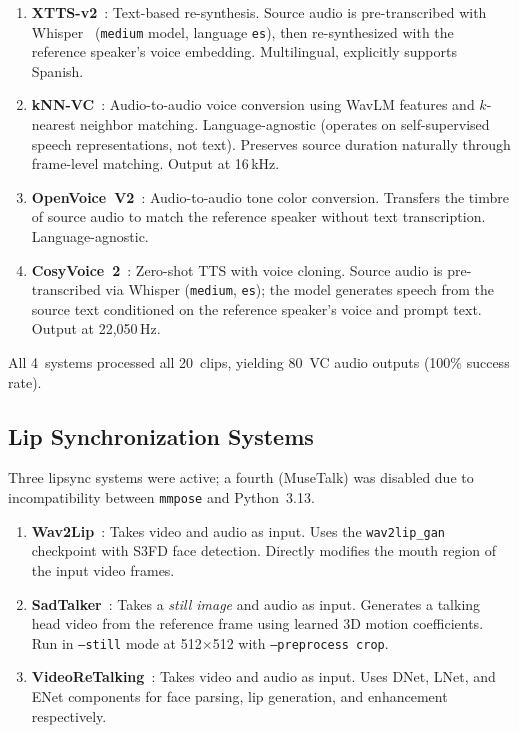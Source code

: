\documentclass[11pt,a4paper]{article}
\begin{document}
\begin{enumerate}
\item \textbf{XTTS-v2}~\citep{casanova2024xtts}: Text-based re-synthesis. Source audio is pre-transcribed with Whisper~\citep{radford2023whisper} (\texttt{medium} model, language \texttt{es}), then re-synthesized with the reference speaker's voice embedding. Multilingual, explicitly supports Spanish.

\item \textbf{kNN-VC}~\citep{baas2023knnvc}: Audio-to-audio voice conversion using WavLM features and $k$-nearest neighbor matching. Language-agnostic (operates on self-supervised speech representations, not text). Preserves source duration naturally through frame-level matching. Output at 16\,kHz.

\item \textbf{OpenVoice~V2}~\citep{qin2023openvoice}: Audio-to-audio tone color conversion. Transfers the timbre of source audio to match the reference speaker without text transcription. Language-agnostic.

\item \textbf{CosyVoice~2}~\citep{du2024cosyvoice}: Zero-shot TTS with voice cloning. Source audio is pre-transcribed via Whisper (\texttt{medium}, \texttt{es}); the model generates speech from the source text conditioned on the reference speaker's voice and prompt text. Output at 22,050\,Hz.
\end{enumerate}

All 4~systems processed all 20~clips, yielding 80~VC audio outputs (100\% success rate).

\subsection{Lip Synchronization Systems}

Three lipsync systems were active; a fourth (MuseTalk) was disabled due to incompatibility between \texttt{mmpose} and Python~3.13.

\begin{enumerate}
\item \textbf{Wav2Lip}~\citep{prajwal2020wav2lip}: Takes video and audio as input. Uses the \texttt{wav2lip\_gan} checkpoint with S3FD face detection. Directly modifies the mouth region of the input video frames.

\item \textbf{SadTalker}~\citep{zhang2023sadtalker}: Takes a \emph{still image} and audio as input. Generates a talking head video from the reference frame using learned 3D motion coefficients. Run in \texttt{--still} mode at 512$\times$512 with \texttt{--preprocess crop}.

\item \textbf{VideoReTalking}~\citep{cheng2022videoretalking}: Takes video and audio as input. Uses DNet, LNet, and ENet components for face parsing, lip generation, and enhancement respectively.
\end{enumerate}
\end{document}
